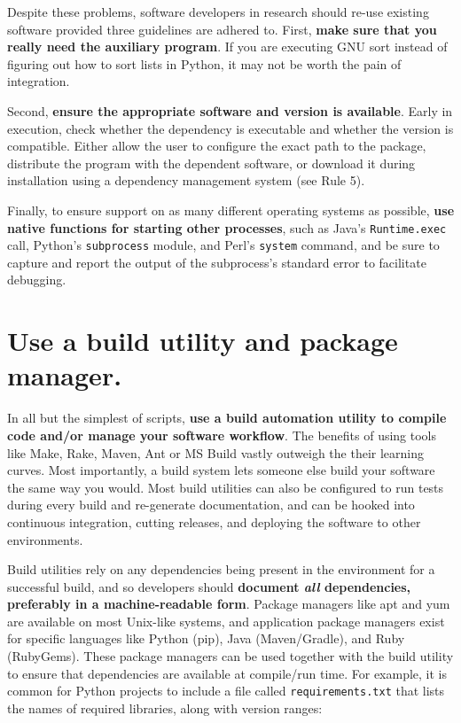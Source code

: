 \documentclass[10pt,letterpaper]{article}
\begin{document}
Despite these problems, software developers in research should
re-use existing software provided three guidelines are adhered to.
First, 
\textbf{make sure that you really need the auxiliary program}. If you are
executing GNU sort instead of figuring out how to sort lists in Python,
it may not be worth the pain of integration.

Second, \textbf{ensure the appropriate software and version is available}.
Early in execution, check whether the dependency is executable and whether the
version is compatible.
Either allow the user to
configure the exact path to the package, distribute the program with the
dependent software, or download it during installation using a
dependency management system (see Rule 5). 

Finally, to ensure support on as many different operating systems as
possible, \textbf{use native functions for starting other processes}, such as
Java's \texttt{Runtime.exec} call, Python's \texttt{subprocess} module, and Perl's \texttt{system}
command, and be sure to capture and report the output of the subprocess's standard error
to facilitate debugging.

\section{Use a build utility and package manager.}

In all but the simplest of scripts, \textbf{use a build
automation utility to compile code and/or manage your software workflow}. The benefits of
using tools like Make, Rake, Maven, Ant or MS Build vastly outweigh the
their learning curves. Most importantly, a build system
lets someone else build your software the same way you would. Most build
utilities can also be configured to run tests during every build and
re-generate documentation, and can be hooked into continuous integration,
cutting releases, and deploying the software to other environments.

Build utilities rely on any dependencies being present in the environment for a
successful build, and so developers should
\textbf{document \emph{all} dependencies, preferably in a machine-readable form}.
Package managers like apt and yum are available on most Unix-like systems, and
application package managers exist for specific languages like Python (pip),
Java (Maven/Gradle), and Ruby (RubyGems). These package managers can be used
together with the build utility to ensure that dependencies are available at
compile/run time.
For example, it is common for Python projects to include a file called
\texttt{requirements.txt} that lists the names of required libraries,
along with version ranges:
\end{document}

